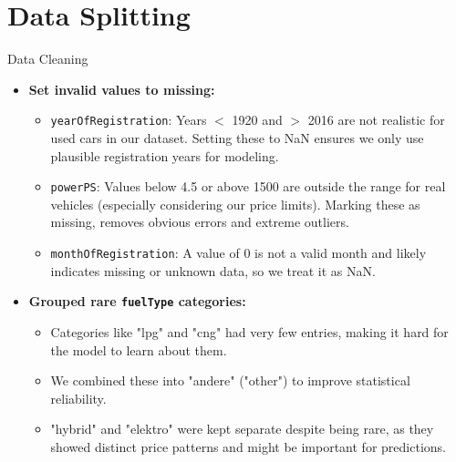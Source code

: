 \documentclass{beamer}
\begin{document}
\section{Data Splitting}
\begin{frame}{Data Cleaning}
    \begin{itemize}
        \item \textbf{Set invalid values to missing:}
        \begin{itemize}
            \item \texttt{yearOfRegistration}: Years $<$ 1920 and $>$ 2016 are not realistic for used cars in our dataset. Setting these to NaN ensures we only use plausible registration years for modeling.
            \item \texttt{powerPS}: Values below 4.5 or above 1500 are outside the range for real vehicles (especially considering our price limits). Marking these as missing, removes obvious errors and extreme outliers.
            \item \texttt{monthOfRegistration}: A value of 0 is not a valid month and likely indicates missing or unknown data, so we treat it as NaN.
        \end{itemize}
        \item \textbf{Grouped rare \texttt{fuelType} categories:}
        \begin{itemize}
            \item Categories like "lpg" and "cng" had very few entries, making it hard for the model to learn about them.
            \item We combined these into "andere" ("other") to improve statistical reliability.
            \item "hybrid" and "elektro" were kept separate despite being rare, as they showed distinct price patterns and might be important for predictions.
        \end{itemize}
    \end{itemize}
\end{frame}
\end{document}
